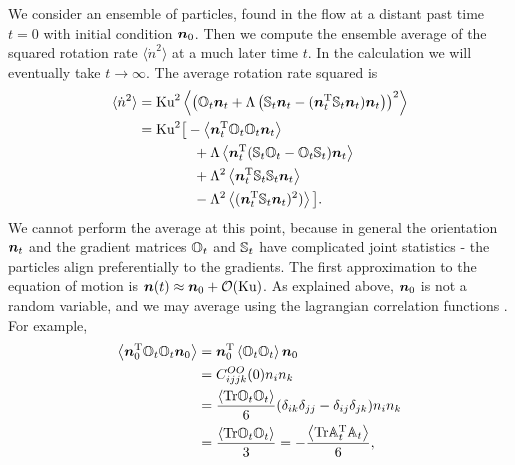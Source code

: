 \documentclass[thesis.tex]{subfiles}
\begin{document}
We consider an ensemble of particles, found in the flow at a distant past time $t=0$ with initial condition $\mbox{\boldmath$n$}_0$. Then we compute the ensemble average of the squared rotation rate $\langle \dot n^2\rangle$ at a much later time $t$.
In the calculation we will eventually take $t\to\infty$. The average rotation rate squared is
\begin{align}
	\langle \dot n^2\rangle &= \ku^2\left\langle\left(\ma O_{t}\ve n_{t}+\Lambda\left(\ma S_{t}\ve n_{t}-(\ve n_{t}\transpose\ma S_{t}\ve n_{t})\ve n_{t}\right)\right)^2\right\rangle\nn \nn\\
	&= \ku^2\big[-\left\langle\ve n_{t}\transpose \ma O_{t} \ma O_{t} \ve n_{t}\right\rangle \nn\\
	&\qquad\qquad+ \Lambda\left\langle\ve n_{t}\transpose(\ma S_{t}\ma O_{t} - \ma O_{t}\ma S_{t})\ve n_t\right\rangle \nn\\
	&\qquad\qquad+ \Lambda^2\left\langle\ve n_{t}\transpose\ma S_{t}\ma S_{t}\ve n_{t}\right\rangle \nn\\
	&\qquad\qquad-  \Lambda^2\left\langle(\ve n_{t}\transpose\ma S_{t}\ve n_{t})^2)\right\rangle\big].\eqnlab{ndotsquared}
\end{align}
We cannot perform the average at this point, because in general the orientation $\mbox{\boldmath$n$}_t$ and the gradient matrices $\mathbb{O}_t$ and $\mathbb{S}_t$ have complicated joint statistics - the particles align preferentially to the gradients. 
The first approximation to the equation of motion  is $\mbox{\boldmath$n$}(t) \approx \mbox{\boldmath$n$}_0 + \mathcal O(\mbox{Ku})$.
As explained above, $\mbox{\boldmath$n$}_0$ is not a random variable, and we may average using the lagrangian correlation functions . For example,
\begin{align*}
 	\left\langle\mbox{\boldmath$n$}_{0}^{\mathrm T} \mathbb{O}_{t} \mathbb{O}_{t} \mbox{\boldmath$n$}_{0}\right\rangle&=\mbox{\boldmath$n$}_{0}^{\mathrm T}\left\langle \mathbb{O}_{t} \mathbb{O}_{t} \right\rangle\mbox{\boldmath$n$}_{0} \\
 	&= C^{OO}_{ijjk}(0)n_in_k\\
 	&= \frac{\left\langle \mbox{Tr} \mathbb{O}_t\mathbb{O}_t\right\rangle}{6}( \delta_{ik}\delta_{jj}-\delta_{ij}\delta_{jk})n_in_k\\
 	&=\frac{\left\langle \mbox{Tr} \mathbb{O}_t\mathbb{O}_t\right\rangle}{3} = -\frac{\left\langle \mbox{Tr} \mathbb{A}_t^{\mathrm T}\mathbb{A}_t\right\rangle}{6},
 \end{align*}
\end{document}

